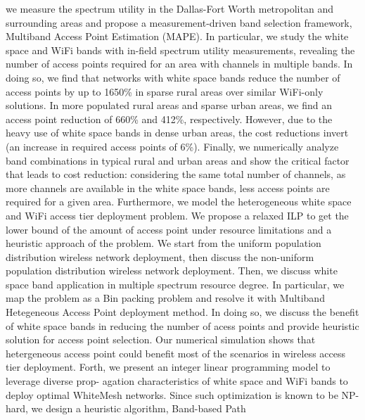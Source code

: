 we measure the spectrum utility in the Dallas-Fort 
Worth metropolitan and surrounding
areas and propose a measurement-driven band selection framework, Multiband Access Point Estimation (MAPE). 
In particular, we study the white space and WiFi bands with in-field spectrum utility measurements, revealing 
the number of access points required for an area with channels in multiple bands. In doing so, we find that 
networks with white space bands reduce the number of access points by up to 1650\% in sparse
rural areas over similar WiFi-only solutions. In more populated rural areas and sparse urban areas, we 
find an access point reduction of 660\% and 412\%, respectively.  However, due to the heavy use of white
space bands in dense urban areas, the cost reductions invert (an increase in required access points 
of 6\%).  Finally, we numerically analyze band combinations in typical rural and urban areas and show 
the critical factor that leads to cost reduction: considering the same total number of channels, as more 
channels are available in the white space bands, less access points are required for a given area.
Furthermore, we model the heterogeneous white space and WiFi access tier 
deployment problem. We propose a relaxed ILP to get the lower bound of the 
amount of access point under resource limitations and a heuristic approach 
of the problem. We start from the uniform population distribution wireless 
network deployment, then discuss the non-uniform population distribution 
wireless network deployment. Then, we discuss white space band application
in multiple spectrum resource degree. 
In particular, we map the problem as a Bin packing problem 
and resolve it with Multiband Hetegeneous Access Point deployment method. 
In doing so, we discuss the benefit of white space bands in reducing 
the number of acess points and provide heuristic solution for access point
 selection. Our numerical simulation shows that
hetergeneous access point could benefit most of the scenarios in wireless
access tier deployment.
Forth,
we present
an integer linear programming model to leverage diverse prop-
agation characteristics of white space and WiFi bands to deploy
optimal WhiteMesh networks. Since such optimization is known
to be NP-hard, we design a heuristic algorithm, Band-based Path
